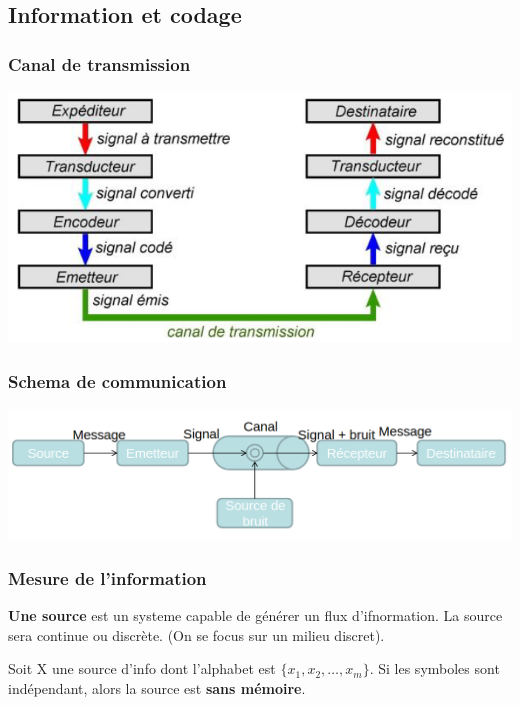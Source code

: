 \documentclass[12pt]{article}
\begin{document}
\subsection*{Information et codage}
\subsubsection*{Canal de transmission}
\begin{minipage}{1\textwidth}
    \includegraphics[scale=0.7]{Canal_de_transmission.png}
\end{minipage}

\subsubsection*{Schema de communication}
\begin{minipage}{1\textwidth}
    \includegraphics[scale=0.4]{Schema_de_communication.png}
\end{minipage}

\subsubsection*{Mesure de l'information}
\textbf{Une source} est un systeme capable de générer un flux d'ifnormation. La source sera continue ou discrète. (On se focus sur un milieu discret).

Soit X une source d'info dont l'alphabet est $\{x_1,x_2,\dots,x_m\}$. Si les symboles sont indépendant, alors la source est \textbf{sans mémoire}.
\end{document}
